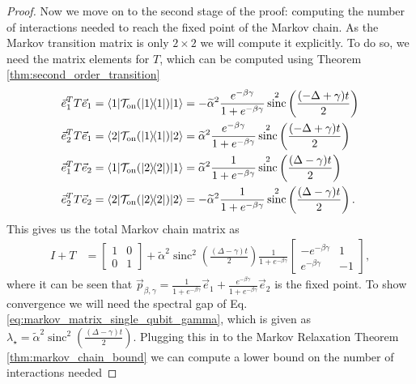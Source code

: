 \documentclass{article}
\newcommand{\on}{\rm on}
\newcommand{\ket}[1]{|#1\rangle}
\newcommand{\bra}[1]{\langle #1|}
\newcommand{\ketbra}[2]{| #1\rangle\! \langle #2|}
\DeclareMathOperator{\sinc}{sinc}
\begin{document}
\begin{proof}
 Now we move on to the second stage of the proof: computing the number of interactions needed to reach the fixed point of the Markov chain. As the Markov transition matrix is only $2 \times 2$ we will compute it explicitly. To do so, we need the matrix elements for $T$, which can be computed using Theorem \ref{thm:second_order_transition} 
\begin{align}
        \vec{e}_1^T T \vec{e}_1 = \bra{1} \mathcal{T}_{\on}(\ketbra{1}{1}) \ket{1} &= - \widetilde{\alpha}^2 \frac{e^{-\beta \gamma}}{1 + e^{-\beta \gamma}} \sinc^2 \left( \frac{(-\Delta + \gamma)t}{2}\right) \label{eq:single_qubit_markov_1}\\
        \vec{e}_2^T T \vec{e}_1 = \bra{2} \mathcal{T}_{\on}(\ketbra{1}{1}) \ket{2} &=  \widetilde{\alpha}^2 \frac{e^{-\beta \gamma}}{1 + e^{-\beta \gamma}} \sinc^2 \left( \frac{(-\Delta + \gamma)t}{2}\right) \\
        \vec{e}_1^T T \vec{e}_2 = \bra{1} \mathcal{T}_{\on}(\ketbra{2}{2}) \ket{1} &=  \widetilde{\alpha}^2 \frac{1}{1 + e^{-\beta \gamma}} \sinc^2 \left( \frac{(\Delta - \gamma)t}{2}\right)\\
        \vec{e}_2^T T \vec{e}_2 = \bra{2} \mathcal{T}_{\on}(\ketbra{2}{2}) \ket{2} &= - \widetilde{\alpha}^2 \frac{1}{1 + e^{-\beta \gamma}} \sinc^2 \left( \frac{(\Delta - \gamma)t}{2}\right). \label{eq:single_qubit_markov_4}
    \end{align}
This gives us the total Markov chain matrix as 
\begin{align}
    I + T &= \begin{bmatrix} 1 & 0 \\ 0 & 1 \end{bmatrix} + \widetilde{\alpha}^2 \sinc^2 \left(\frac{(\Delta - \gamma)t}{2} \right) \frac{1}{1 + e^{-\beta \gamma}}\begin{bmatrix} -e^{-\beta \gamma} & 1 \\ e^{-\beta \gamma} & -1\end{bmatrix},\label{eq:markov_matrix_single_qubit_gamma}
\end{align}
 where it can be seen that $\vec{p}_{\beta, \gamma} = \frac{1}{1 + e^{-\beta \gamma}} \vec{e}_1 + \frac{e^{-\beta \gamma}}{1 + e^{-\beta \gamma}} \vec{e}_2$ is the fixed point. To show convergence we will need the spectral gap of Eq. \eqref{eq:markov_matrix_single_qubit_gamma}, which is given as $\lambda_{\star} = \widetilde{\alpha}^2 \sinc^2 \left( \frac{(\Delta - \gamma) t}{2} \right)$. Plugging this in to the Markov Relaxation Theorem \ref{thm:markov_chain_bound} we can compute a lower bound on the number of interactions needed 

\end{proof}
\end{document}
